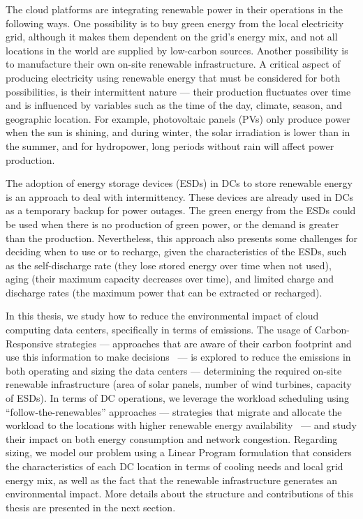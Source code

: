 The cloud platforms are integrating renewable power in their operations in the following ways. One possibility is to buy green energy from the local electricity grid, although it makes them dependent on the grid's energy mix, and not all locations in the world are supplied by low-carbon sources. Another possibility is to manufacture their own on-site renewable infrastructure. A critical aspect of producing electricity using renewable energy that must be considered for both possibilities,  is their intermittent nature --- their production fluctuates over time and is influenced by variables such as the time of the day, climate, season, and geographic location. For example, photovoltaic panels (PVs) only produce power when the sun is shining, and during winter, the solar irradiation is lower than in the summer, and for hydropower, long periods without rain will affect power production.


The adoption of energy storage devices (ESDs) in DCs to store renewable energy~\cite{wang2012_EDCS} is an approach to deal with intermittency. These devices are already used in DCs as a temporary backup for power outages. The green energy from the ESDs could be used when there is no production of green power, or the demand is greater than the production. Nevertheless, this approach also presents some challenges for deciding when to use or to recharge, given the characteristics of the ESDs, such as the self-discharge rate (they lose stored energy over time when not used), aging (their maximum capacity decreases over time), and limited charge and discharge rates (the maximum power that can be extracted or recharged).

In this thesis, we study how to reduce the environmental impact of cloud computing data centers, specifically in terms of  emissions. The usage of Carbon-Responsive strategies --- approaches that are aware of their carbon footprint and use this information to make decisions~\cite{schooler2021carbonaware} --- is explored to reduce the  emissions in both operating and sizing the data centers ---  determining the required on-site renewable infrastructure (area of solar panels, number of wind turbines, capacity of ESDs). In terms of DC operations, we leverage the workload scheduling using ``follow-the-renewables'' approaches --- strategies that migrate and allocate the workload to the locations with higher renewable energy availability~\cite{shuja2016sustainable} --- and study their impact on both energy consumption and network congestion. Regarding sizing, we model our problem using a Linear Program formulation that considers the characteristics of each DC location in terms of cooling needs and local grid energy mix, as well as the fact that the renewable infrastructure generates an environmental impact. More details about the structure and contributions of this thesis are presented in the next section.
 
